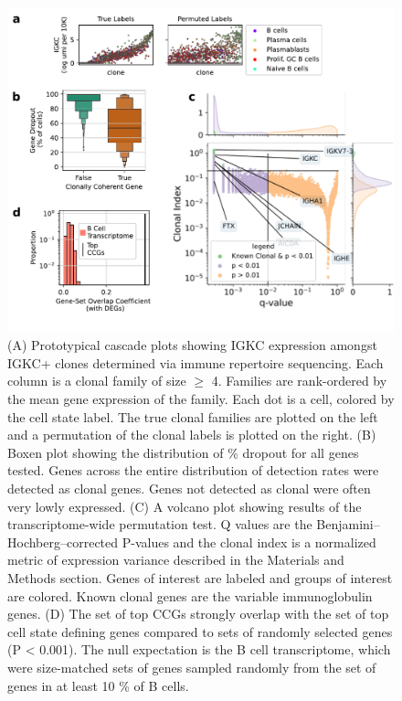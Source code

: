 \begin{figure}[hbt!]
\centering
\includegraphics[width=12cm, keepaspectratio]{figs/InVitro/fig4_bcd.pdf}
\caption[Clonal transcriptional programs are strongly enriched for fate determining genes.]{(A) Prototypical cascade plots showing IGKC expression amongst IGKC+ clones determined via immune repertoire sequencing. Each column is a clonal family of size $\geq$ 4. Families are rank-ordered by the mean gene expression of the family. Each dot is a cell, colored by the cell state label. The true clonal families are plotted on the left and a permutation of the clonal labels is plotted on the right. (B) Boxen plot showing the distribution of \% dropout for all genes tested. Genes across the entire distribution of detection rates were detected as clonal genes. Genes not detected as clonal were often very lowly expressed. (C) A volcano plot showing results of the transcriptome-wide permutation test. Q values are the Benjamini–Hochberg–corrected P-values and the clonal index is a normalized metric of expression variance described in the Materials and Methods section. Genes of interest are labeled and groups of interest are colored. Known clonal genes are the variable immunoglobulin genes. (D) The set of top CCGs strongly overlap with the set of top cell state defining genes compared to sets of randomly selected genes (P < 0.001). The null expectation is the B cell transcriptome, which were size-matched sets of genes sampled randomly from the set of genes in at least 10 \% of B cells.}
\label{fig:paper2_fig_4}
\end{figure}
